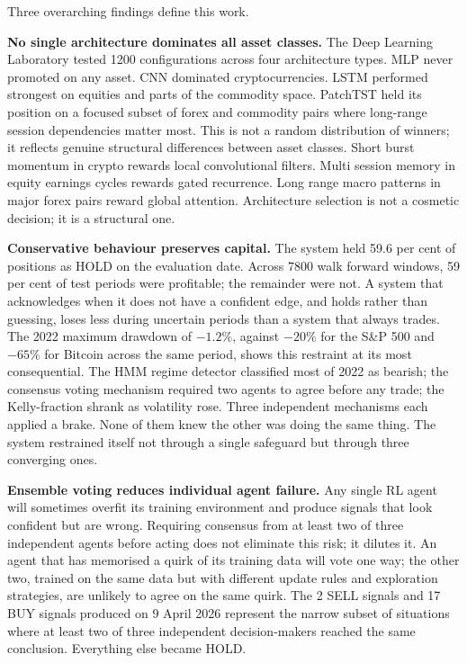 \documentclass[journal]{IEEEtran}
\begin{document}
Three overarching findings define this work.

\textbf{No single architecture dominates all asset classes.} The Deep
Learning Laboratory tested 1200 configurations across four architecture
types. MLP never promoted on any asset. CNN dominated cryptocurrencies.
LSTM performed strongest on equities and parts of the commodity space.
PatchTST held its position on a focused subset of forex and commodity
pairs where long-range session dependencies matter most. This is not a
random distribution of winners; it reflects genuine structural differences
between asset classes. Short burst momentum in crypto rewards local
convolutional filters. Multi session memory in equity earnings cycles
rewards gated recurrence. Long range macro patterns in major forex pairs
reward global attention. Architecture selection is not a cosmetic
decision; it is a structural one.

\textbf{Conservative behaviour preserves capital.} The system held 59.6
per cent of positions as HOLD on the evaluation date. Across 7800 walk
forward windows, 59 per cent of test periods were profitable; the
remainder were not. A system that acknowledges when it does not have
a confident edge, and holds rather than guessing, loses less during
uncertain periods than a system that always trades. The 2022 maximum
drawdown of $-1.2\%$, against $-20\%$ for the S\&P 500 and $-65\%$ for
Bitcoin across the same period, shows this restraint at its most
consequential. The HMM regime detector classified most of 2022 as
bearish; the consensus voting mechanism required two agents to agree
before any trade; the Kelly-fraction shrank as volatility rose. Three
independent mechanisms each applied a brake. None of them knew the other
was doing the same thing. The system restrained itself not through a
single safeguard but through three converging ones.

\textbf{Ensemble voting reduces individual agent failure.} Any single
RL agent will sometimes overfit its training environment and produce
signals that look confident but are wrong. Requiring consensus from at
least two of three independent agents before acting does not eliminate
this risk; it dilutes it. An agent that has memorised a quirk of its
training data will vote one way; the other two, trained on the same data
but with different update rules and exploration strategies, are unlikely
to agree on the same quirk. The 2 SELL signals and 17 BUY signals
produced on 9 April 2026 represent the narrow subset of situations where
at least two of three independent decision-makers reached the same
conclusion. Everything else became HOLD.
\end{document}
